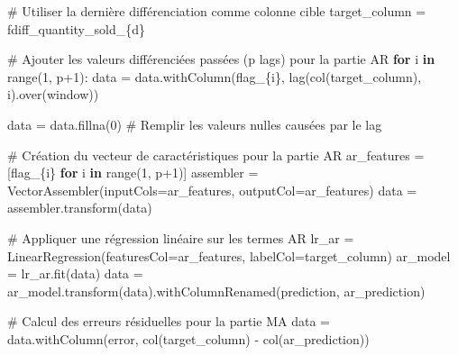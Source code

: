 \documentclass[
  letterpaper,
  DIV=11,
  numbers=noendperiod]{scrartcl}
\newenvironment{Shaded}{\begin{snugshade}}{\end{snugshade}}
\newcommand{\BuiltInTok}[1]{\textcolor[rgb]{0.00,0.23,0.31}{#1}}
\newcommand{\CommentTok}[1]{\textcolor[rgb]{0.37,0.37,0.37}{#1}}
\newcommand{\ControlFlowTok}[1]{\textcolor[rgb]{0.00,0.23,0.31}{\textbf{#1}}}
\newcommand{\DecValTok}[1]{\textcolor[rgb]{0.68,0.00,0.00}{#1}}
\newcommand{\KeywordTok}[1]{\textcolor[rgb]{0.00,0.23,0.31}{\textbf{#1}}}
\newcommand{\NormalTok}[1]{\textcolor[rgb]{0.00,0.23,0.31}{#1}}
\newcommand{\OperatorTok}[1]{\textcolor[rgb]{0.37,0.37,0.37}{#1}}
\newcommand{\SpecialCharTok}[1]{\textcolor[rgb]{0.37,0.37,0.37}{#1}}
\newcommand{\SpecialStringTok}[1]{\textcolor[rgb]{0.13,0.47,0.30}{#1}}
\newcommand{\StringTok}[1]{\textcolor[rgb]{0.13,0.47,0.30}{#1}}
\begin{document}
\begin{Shaded}
\begin{Highlighting}[]
    \CommentTok{\# Utiliser la dernière différenciation comme colonne cible}
\NormalTok{    target\_column }\OperatorTok{=} \SpecialStringTok{f\textquotesingle{}diff\_quantity\_sold\_}\SpecialCharTok{\{}\NormalTok{d}\SpecialCharTok{\}}\SpecialStringTok{\textquotesingle{}}

    \CommentTok{\# Ajouter les valeurs différenciées passées (p lags) pour la partie AR}
    \ControlFlowTok{for}\NormalTok{ i }\KeywordTok{in} \BuiltInTok{range}\NormalTok{(}\DecValTok{1}\NormalTok{, p}\OperatorTok{+}\DecValTok{1}\NormalTok{):}
\NormalTok{        data }\OperatorTok{=}\NormalTok{ data.withColumn(}\SpecialStringTok{f\textquotesingle{}lag\_}\SpecialCharTok{\{}\NormalTok{i}\SpecialCharTok{\}}\SpecialStringTok{\textquotesingle{}}\NormalTok{, lag(col(target\_column), i).over(window))}

\NormalTok{    data }\OperatorTok{=}\NormalTok{ data.fillna(}\DecValTok{0}\NormalTok{)  }\CommentTok{\# Remplir les valeurs nulles causées par le lag}

    \CommentTok{\# Création du vecteur de caractéristiques pour la partie AR}
\NormalTok{    ar\_features }\OperatorTok{=}\NormalTok{ [}\SpecialStringTok{f\textquotesingle{}lag\_}\SpecialCharTok{\{}\NormalTok{i}\SpecialCharTok{\}}\SpecialStringTok{\textquotesingle{}} \ControlFlowTok{for}\NormalTok{ i }\KeywordTok{in} \BuiltInTok{range}\NormalTok{(}\DecValTok{1}\NormalTok{, p}\OperatorTok{+}\DecValTok{1}\NormalTok{)]}
\NormalTok{    assembler }\OperatorTok{=}\NormalTok{ VectorAssembler(inputCols}\OperatorTok{=}\NormalTok{ar\_features, outputCol}\OperatorTok{=}\StringTok{\textquotesingle{}ar\_features\textquotesingle{}}\NormalTok{)}
\NormalTok{    data }\OperatorTok{=}\NormalTok{ assembler.transform(data)}

    \CommentTok{\# Appliquer une régression linéaire sur les termes AR}
\NormalTok{    lr\_ar }\OperatorTok{=}\NormalTok{ LinearRegression(featuresCol}\OperatorTok{=}\StringTok{\textquotesingle{}ar\_features\textquotesingle{}}\NormalTok{, labelCol}\OperatorTok{=}\NormalTok{target\_column)}
\NormalTok{    ar\_model }\OperatorTok{=}\NormalTok{ lr\_ar.fit(data)}
\NormalTok{    data }\OperatorTok{=}\NormalTok{ ar\_model.transform(data).withColumnRenamed(}\StringTok{\textquotesingle{}prediction\textquotesingle{}}\NormalTok{, }\StringTok{\textquotesingle{}ar\_prediction\textquotesingle{}}\NormalTok{)}

    \CommentTok{\# Calcul des erreurs résiduelles pour la partie MA}
\NormalTok{    data }\OperatorTok{=}\NormalTok{ data.withColumn(}\StringTok{\textquotesingle{}error\textquotesingle{}}\NormalTok{, col(target\_column) }\OperatorTok{{-}}\NormalTok{ col(}\StringTok{\textquotesingle{}ar\_prediction\textquotesingle{}}\NormalTok{))}


\end{Highlighting}
\end{Shaded}
\end{document}
